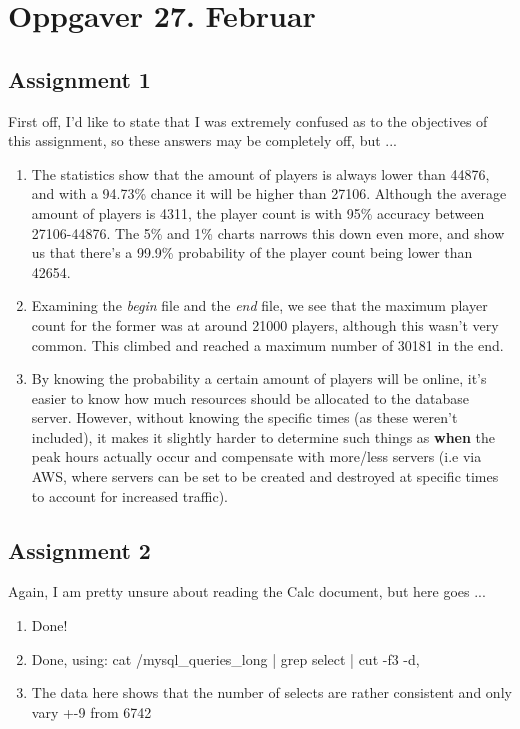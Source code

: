 \section{Oppgaver 27. Februar}

\subsection{Assignment 1} 

First off, I'd like to state that I was extremely confused as to the objectives of this assignment, so these answers may be completely off, but ...

\begin{enumerate}
	\item The statistics show that the amount of players is always lower than 44876, and with a 94.73\% chance it will be higher than 27106. Although the average amount of players is 4311, the player count is with 95\% accuracy between 27106-44876. The 5\% and 1\% charts narrows this down even more, and show us that there's a 99.9\% probability of the player count being lower than 42654. 
	\item Examining the \textit{begin} file and the \textit{end} file, we see that the maximum player count for the former was at around 21000 players, although this wasn't very common. This climbed and reached a maximum number of 30181 in the end.
	\item By knowing the probability a certain amount of players will be online, it's easier to know how much resources should be allocated to the database server. However, without knowing the specific times (as these weren't included), it makes it slightly harder to determine such things as \textbf{when} the peak hours actually occur and compensate with more/less servers (i.e via AWS, where servers can be set to be created and destroyed at specific times to account for increased traffic).
	
\end{enumerate}

\subsection{Assignment 2}

Again, I am pretty unsure about reading the Calc document, but here goes ...
\begin{enumerate}
	\item Done!
	\item Done, using: cat /mysql\_queries\_long | grep select | cut -f3 -d, 
	\item The data here shows that the number of selects are rather consistent and only vary +-9 from 6742
\end{enumerate}

